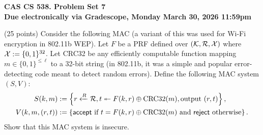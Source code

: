 \documentclass[12pt]{article}
\newif\ifsol
\begin{document}
\begin{center}
\Large{\textbf{CAS CS 538.  \ifsol Solutions to \fi Problem Set 7}}\\
\smallskip
\large{\textbf{Due electronically via Gradescope, Monday March 30, 2026 11:59pm
}}
\end{center}

\noindent
 

\begin{problem} (25 points)
Consider the following MAC (a variant of this was used for Wi\nobreakdash-Fi encryption in 802.11b WEP).
Let $F$ be a PRF defined over $(\mathcal{K}, \mathcal{R}, \mathcal{X})$ where $\mathcal{X} := \{0, 1\}^{32}$.
Let CRC32 be any efficiently computable function mapping $m \in \{0, 1\}^{\le \ell}$ to a 32-bit string (in 802.11b, it was a simple and popular error-detecting code meant to detect random errors).
Define the following MAC system $(S, V)$:
\begin{align*}
	S(k, m) &:= \left\{r \xleftarrow{R} \mathcal{R}, t \twoheadleftarrow F(k, r) \oplus \text{CRC32}(m), \text{output }(r, t)\right\}, \\
	V(k, m, (r, t)) &:= \left\{\textsf{accept}\text{ if }t = F(k, r) \oplus \text{CRC32}(m)\text{ and }\textsf{reject}\text{ otherwise}\right\}.
\end{align*}
Show that this MAC system is insecure.
\end{problem} 
  
\end{document}
